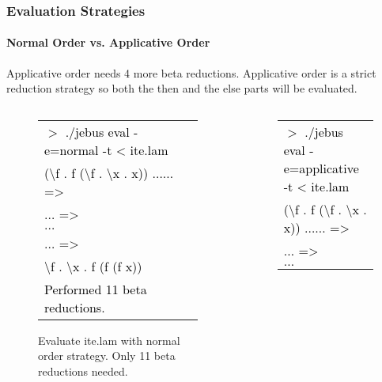 \documentclass[xcolor=table]{beamer}
\begin{document}
\begin{frame}
\frametitle{Evaluation Strategies}
\framesubtitle{Normal Order vs. Applicative Order}
Applicative order needs 4 more beta reductions.  
Applicative order is a strict reduction strategy so both the then and the else parts
will be evaluated.
\begin{block}{
  \begin{columns}[T] %
     \begin{column}[T]{6cm} %
          \begin{figure}[h!]
				 \begin{footnotesize}
				 \begin{tabular}{l}
				 \textcolor{black}{
			      $>$ ./jebus eval -e=normal -t < ite.lam} \\
			      \textcolor{black}{(\textbackslash f . f (\textbackslash f . \textbackslash x . x)) $\ldots \ldots$ =>} \\ 
			      \textcolor{black}{$\ldots$ =>} \\
				  \textcolor{black}{$\ldots$} \\
			      \textcolor{black}{$\ldots$ =>} \\
			      \textcolor{black}{\textbackslash f . \textbackslash x . f (f (f x))} \\
			      \textcolor{black}{Performed 11 beta reductions.} \\
			      \end{tabular}	
				 \end{footnotesize}
			  \caption{Evaluate ite.lam with normal order strategy. Only 11 beta reductions needed.}
		 \end{figure}
     \end{column}
     \begin{column}[T]{6cm} %
		 \begin{figure}[h!]
				\begin{footnotesize}
				\rowcolors{1}{gray}{gray}
				 \begin{tabular}{l}
				 \textcolor{black}{
			      $>$ ./jebus eval -e=applicative -t < ite.lam} \\
			      \textcolor{black}{(\textbackslash f . f (\textbackslash f . \textbackslash x . x)) $\ldots \ldots$ =>} \\ 
			      \textcolor{black}{$\ldots$ =>} \\
				  \textcolor{black}{$\ldots$} \\

\end{tabular}
\end{footnotesize}
\end{figure}
\end{column}
\end{columns}}
\end{block}
\end{frame}
\end{document}
